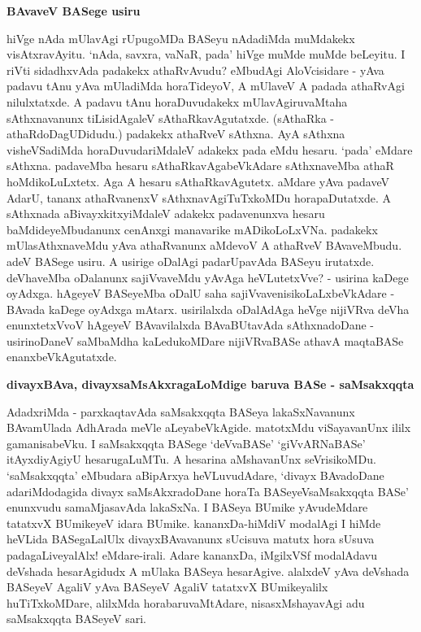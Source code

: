 {\bigskip
\noindent
{\large\bf BAvaveV BASege usiru}}\label{page9}
\medskip

\noindent
hiVge nAda mUlavAgi rUpugoMDa BASeyu nAdadiMda muMdakekx visAtxravAyitu. `nAda, savxra, vaNaR, pada' hiVge muMde muMde beLeyitu. I riVti sidadhxvAda padakekx athaRvAvudu? eMbudAgi AloVcisidare - yAva padavu tAnu yAva mUladiMda horaTideyoV, A mUlaveV A padada athaRvAgi nilulxtatxde. A padavu tAnu horaDuvudakekx mUlavAgiruvaMtaha sAthxnavanunx tiLisidAgaleV sAthaRkavAgutatxde. (sAthaRka - athaRdoDagUDidudu.) padakekx athaRveV sAthxna. AyA sAthxna visheVSadiMda horaDuvudariMdaleV adakekx pada eMdu hesaru. `pada' eMdare sAthxna. padaveMba hesaru sAthaRkavAgabeVkAdare sAthxnaveMba athaR hoMdikoLuLxtetx. Aga A hesaru sAthaRkavAgutetx. aMdare yAva padaveV AdarU, tananx athaRvanenxV sAthxnavAgiTuTxkoMDu horapaDutatxde. A sAthxnada aBivayxkitxyiMdaleV adakekx padavenunxva hesaru baMdideyeMbudanunx cenAnxgi manavarike mADikoLoLxVNa. padakekx mUlasAthxnaveMdu yAva athaRvanunx aMdevoV A athaRveV BAvaveMbudu. adeV BASege usiru. A usirige oDalAgi padarUpavAda BASeyu irutatxde. deVhaveMba oDalanunx sajiVvaveMdu yAvAga heVLutetxVve? - usirina kaDege oyAdxga. hAgeyeV BASeyeMba oDalU saha sajiVvavenisikoLaLxbeVkAdare - BAvada kaDege oyAdxga mAtarx. usirilalxda oDalAdAga heVge nijiVRva deVha enunxtetxVvoV hAgeyeV BAvavilalxda BAvaBUtavAda sAthxnadoDane - usirinoDaneV saMbaMdha kaLedukoMDare nijiVRvaBASe athavA maqtaBASe enanxbeVkAgutatxde.

{\bigskip
\noindent
{\large\bf divayxBAva, divayxsaMsAkxragaLoMdige baruva BASe - saMsakxqqta}}\label{page10}
\medskip

\noindent
AdadxriMda - parxkaqtavAda saMsakxqqta BASeya lakaSxNavanunx BAvamUlada AdhArada meVle aLeyabeVkAgide. matotxMdu viSayavanUnx ililx gamanisabeVku. I \hbox{saMsakxqqta} BASege `deVvaBASe' `giVvARNaBASe' itAyxdiyAgiyU hesarugaLuMTu. A hesarina aMshavanUnx seVrisikoMDu. `saMsakxqqta' eMbudara aBipArxya heVLuvudAdare, `divayx BAvadoDane adariMdodagida divayx saMsAkxradoDane horaTa BASeyeVsaMsakxqqta BASe' enunxvudu samaMjasavAda lakaSxNa. I BASeya BUmike yAvudeMdare tatatxvX BUmikeyeV idara BUmike. kananxDa-hiMdiV modalAgi I hiMde heVLida BASegaLalUlx divayxBAvavanunx sUcisuva matutx hora sUsuva padagaLiveyalAlx! eMdare-irali. Adare kananxDa, iMgilxVSf modalAdavu deVshada hesarAgidudx A mUlaka BASeya hesarAgive. alalxdeV yAva deVshada BASeyeV AgaliV yAva BASeyeV AgaliV tatatxvX BUmikeyalilx huTiTxkoMDare, alilxMda horabaruvaMtAdare, nisasxMshayavAgi adu saMsakxqqta BASeyeV sari.

